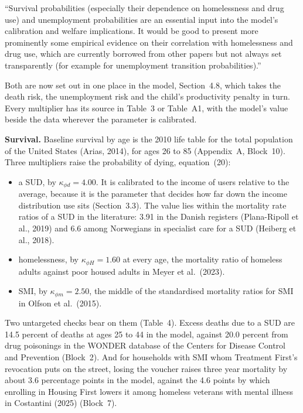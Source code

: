 \documentclass[11pt]{article}
\begin{document}
\begin{referee}
``Survival probabilities (especially their dependence on homelessness and drug
use) and unemployment probabilities are an essential input into the model's
calibration and welfare implications. It would be good to present more prominently
some empirical evidence on their correlation with homelessness and drug use, which
are currently borrowed from other papers but not always set transparently (for
example for unemployment transition probabilities).''
\end{referee}
\begin{response}
Both are now set out in one place in the model, Section~4.8, which takes the death
risk, the unemployment risk and the child's productivity penalty in turn. Every
multiplier has its source in Table~3 or Table~A1, with the model's value beside the
data wherever the parameter is calibrated.

\textbf{Survival.} Baseline survival by age is the 2010 life table for the total
population of the United States (Arias, 2014), for ages 26 to 85 (Appendix~A,
Block~10). Three multipliers raise the probability of dying, equation~(20):
\begin{itemize}
\item a SUD, by $\kappa_{\phi d}=4.00$. It is calibrated to the income of users
relative to the average, because it is the parameter that decides how far down the
income distribution use sits (Section~3.3). The value lies within the mortality rate
ratios of a SUD in the literature: 3.91 in the Danish registers (Plana-Ripoll et al.,
2019) and 6.6 among Norwegians in specialist care for a SUD (Heiberg et al., 2018).
\item homelessness, by $\kappa_{\phi H}=1.60$ at every age, the mortality ratio of
homeless adults against poor housed adults in Meyer et al.\ (2023).
\item SMI, by $\kappa_{\phi m}=2.50$, the middle of the standardised mortality ratios
for SMI in Olfson et al.\ (2015).
\end{itemize}
Two untargeted checks bear on them (Table~4). Excess deaths due to a SUD are 14.5
percent of deaths at ages 25 to 44 in the model, against 20.0 percent from drug
poisonings in the WONDER database of the Centers for Disease Control and Prevention
(Block~2). And for households with SMI whom Treatment First's revocation puts on the
street, losing the voucher raises three year mortality by about 3.6 percentage points
in the model, against the 4.6 points by which enrolling in Housing First lowers it
among homeless veterans with mental illness in Costantini (2025) (Block~7).


\end{response}
\end{document}

